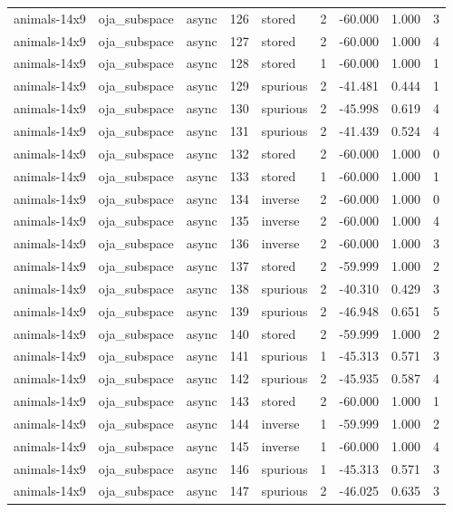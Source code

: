 \begin{tabular}{lllrlrrrr}
animals-14x9 & oja\_subspace & async & 126 & stored & 2 & -60.000 & 1.000 & 3 \\
animals-14x9 & oja\_subspace & async & 127 & stored & 2 & -60.000 & 1.000 & 4 \\
animals-14x9 & oja\_subspace & async & 128 & stored & 1 & -60.000 & 1.000 & 1 \\
animals-14x9 & oja\_subspace & async & 129 & spurious & 2 & -41.481 & 0.444 & 1 \\
animals-14x9 & oja\_subspace & async & 130 & spurious & 2 & -45.998 & 0.619 & 4 \\
animals-14x9 & oja\_subspace & async & 131 & spurious & 2 & -41.439 & 0.524 & 4 \\
animals-14x9 & oja\_subspace & async & 132 & stored & 2 & -60.000 & 1.000 & 0 \\
animals-14x9 & oja\_subspace & async & 133 & stored & 1 & -60.000 & 1.000 & 1 \\
animals-14x9 & oja\_subspace & async & 134 & inverse & 2 & -60.000 & 1.000 & 0 \\
animals-14x9 & oja\_subspace & async & 135 & inverse & 2 & -60.000 & 1.000 & 4 \\
animals-14x9 & oja\_subspace & async & 136 & inverse & 2 & -60.000 & 1.000 & 3 \\
animals-14x9 & oja\_subspace & async & 137 & stored & 2 & -59.999 & 1.000 & 2 \\
animals-14x9 & oja\_subspace & async & 138 & spurious & 2 & -40.310 & 0.429 & 3 \\
animals-14x9 & oja\_subspace & async & 139 & spurious & 2 & -46.948 & 0.651 & 5 \\
animals-14x9 & oja\_subspace & async & 140 & stored & 2 & -59.999 & 1.000 & 2 \\
animals-14x9 & oja\_subspace & async & 141 & spurious & 1 & -45.313 & 0.571 & 3 \\
animals-14x9 & oja\_subspace & async & 142 & spurious & 2 & -45.935 & 0.587 & 4 \\
animals-14x9 & oja\_subspace & async & 143 & stored & 2 & -60.000 & 1.000 & 1 \\
animals-14x9 & oja\_subspace & async & 144 & inverse & 1 & -59.999 & 1.000 & 2 \\
animals-14x9 & oja\_subspace & async & 145 & inverse & 1 & -60.000 & 1.000 & 4 \\
animals-14x9 & oja\_subspace & async & 146 & spurious & 1 & -45.313 & 0.571 & 3 \\
animals-14x9 & oja\_subspace & async & 147 & spurious & 2 & -46.025 & 0.635 & 3 \\

\end{tabular}
